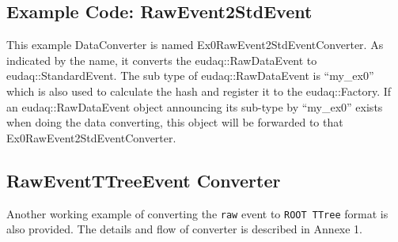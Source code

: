\subsection{Example Code: RawEvent2StdEvent}\label{sec:Ex0RawEvent2StdEventConverter_cc}
This example DataConverter is named Ex0RawEvent2StdEventConverter. As indicated by the name, it converts the eudaq::RawDataEvent to eudaq::StandardEvent. The sub type of eudaq::RawDataEvent is ``my\_ex0'' which is also used to calculate the hash and register it to the eudaq::Factory. If an eudaq::RawDataEvent object announcing its sub-type by ``my\_ex0'' exists when doing the data converting, this object will be forwarded to that Ex0RawEvent2StdEventConverter.



\subsection{RawEventTTreeEvent Converter}\label{sec:Ex0RawEvent2TTreeEventConverter_cc}

Another working example of converting the {\tt raw} event to {\tt ROOT TTree} format is also provided. The details and flow of converter is described in Annexe 1. 

